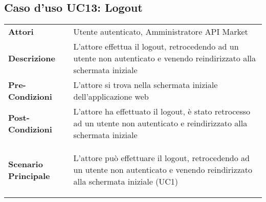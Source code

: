\newpage
\subsection{Caso d'uso UC13: Logout}
\label{UC13}

\begin{longtable}{ l | p{11cm}}
	\hline
	\rowcolor{Gray}
	\multicolumn{2}{c}{UC13 - Logout} \\
	\hline
	\textbf{Attori} & Utente autenticato, Amministratore API Market \\
	\textbf{Descrizione} & L'attore effettua il logout, retrocedendo ad un utente non autenticato e venendo reindirizzato alla schermata iniziale \\
	\textbf{Pre-Condizioni} & L'attore si trova nella schermata iniziale dell'applicazione web \\
	\textbf{Post-Condizioni}& L'attore ha effettuato il logout, è stato retrocesso ad un utente non autenticato e reindirizzato alla schermata iniziale \\
	\textbf{Scenario Principale} & 
	\begin{enumerate*}[label=(\arabic*.),itemjoin={\newline}]
		\item L'attore può effettuare il logout, retrocedendo ad un utente non autenticato e venendo reindirizzato alla schermata iniziale (UC1)
	\end{enumerate*}\\
\end{longtable}